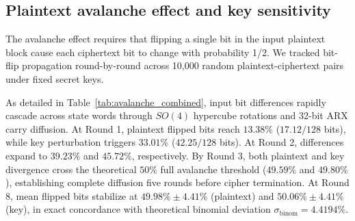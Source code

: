 \documentclass[10pt,twocolumn]{article}
\begin{document}
\subsection{Plaintext avalanche effect and key sensitivity}
\label{subsec:avalanche_sensitivity}
The avalanche effect requires that flipping a single bit in the input plaintext block cause each ciphertext bit to change with probability 1/2. We tracked bit-flip propagation round-by-round across 10,000 random plaintext-ciphertext pairs under fixed secret keys.

\begin{table}[htbp]
\caption{Plaintext avalanche effect and key sensitivity propagation across rounds 1 to 8 (10,000 executions)}
\label{tab:avalanche_combined}
\centering
\small
{}
\end{table}

As detailed in Table~\ref{tab:avalanche_combined}, input bit differences rapidly cascade across state words through $SO(4)$ hypercube rotations and 32-bit ARX carry diffusion. At Round 1, plaintext flipped bits reach $13.38\%$ ($17.12 / 128$ bits), while key perturbation triggers $33.01\%$ ($42.25 / 128$ bits). At Round 2, differences expand to $39.23\%$ and $45.72\%$, respectively. By Round 3, both plaintext and key divergence cross the theoretical $50\%$ full avalanche threshold ($49.59\%$ and $49.80\%$), establishing complete diffusion five rounds before cipher termination. At Round 8, mean flipped bits stabilize at $49.98\% \pm 4.41\%$ (plaintext) and $50.06\% \pm 4.41\%$ (key), in exact concordance with theoretical binomial deviation $\sigma_{\text{binom}} = 4.4194\%$.
\end{document}
